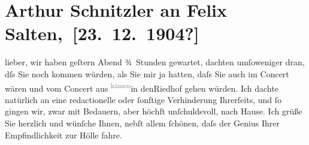 

         
         \renewcommand{\erwaehntePersonen}{Personen: Felix Salten, Ottilie Salten, Richard Wagner}
         \renewcommand{\erwaehnteOrte}{Orte: Oper, Riedhof, Wien}
         \renewcommand{\erwaehnteWerke}{Werke: Symphonie Nr. 3 D-Moll, Tristan und Isolde}
               \section[ Arthur Schnitzler an Felix Salten, {[}23. 12. 1904?{]}]{ Arthur Schnitzler an Felix Salten, {[}23. 12. 1904?{]}}\nopagebreak{}\rehead{ }\begin{ledgroupsized}[t]{13cm}\normalsize\beginnumbering{} \toendnotes[C]{\smallbreak\pagebreak[2]} 
\toendnotes[C]{\smallbreak}\pstart
           \noindent{}{\pb}lieber, wir haben geſtern{ }Abend ¾ Stunden gewartet, dachten umſoweniger dran, dſs Sie noch kommen
               würden, als Sie mir ja \label{K_L02994-1v}\label{K_L02994-1h} hatten, daſs Sie auch im Concert wären und vom Concert aus \substVorne{}\textsuperscript{\textcolor{gray}{kämen}}\substDazwischen{}in den\substHinten{}{ }Riedhof gehen {\pb}würden. Ich dachte natürlich an eine
               redactionelle oder ſonſtige Verhinderung Ihrerſeits, und ſo gingen wir, zwar mit
               Bedauern, aber höchſt unſchuldsvoll, nach Hause.\pend
           \pstart
           Ich grüße Sie herzlich und wünſche Ihnen, nebſt allem ſchönen, daſs der Genius Ihrer
                  {\pb}Empfindlichkeit zur Hölle fahre.\pend

\end{ledgroupsized}
